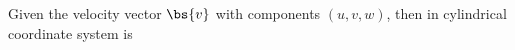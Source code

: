 Given the velocity vector $\bs{v}$ with components $(u,v,w)$, then  in cylindrical coordinate system is 
